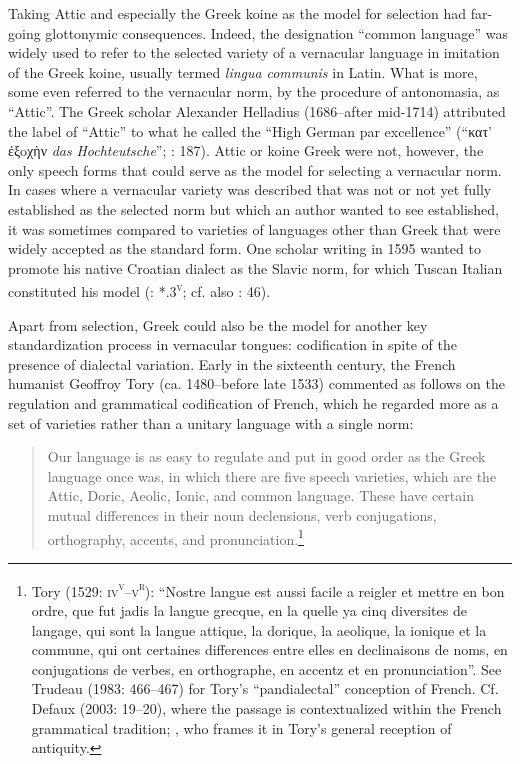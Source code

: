 Taking Attic and especially the Greek koine as the model for selection had far-going glottonymic consequences. Indeed, the designation “common language” was widely used to refer to the selected variety of a vernacular language in imitation of the Greek koine, usually termed \textit{lingua} \textit{communis} in Latin. What is more, some even referred to the vernacular norm, by the procedure of antonomasia, as “Attic”. The Greek scholar Alexander Helladius (1686–after mid-1714) attributed the label of “Attic” to what he called the “High German par excellence” (“κατ’ ἐξoχὴν \textit{das} \textit{Hochteutsche}”; \citealt{Helladius1714}: 187). Attic or koine Greek were not, however, the only speech forms that could serve as the model for selecting a vernacular norm. In cases where a vernacular variety was described that was not or not yet fully established as the selected norm but which an author wanted to see established, it was sometimes compared to varieties of languages other than Greek that were widely accepted as the standard form. One scholar writing in 1595 wanted to promote his native Croatian dialect as the Slavic norm, for which Tuscan Italian constituted his model (\citealt{Veranzio1595}: *.3\textsc{\textsuperscript{v}}; cf. also \citealt{Schoppe1636}: 46).

Apart from selection, Greek could also be the model for another key standardization process in vernacular tongues: codification in spite of the presence of dialectal variation. Early in the sixteenth century, the French humanist Geoffroy Tory (ca. 1480–before late 1533) commented as follows on the regulation and grammatical codification of French, which he regarded more as a set of varieties rather than a unitary language with a single norm:

\begin{quote}
Our language is as easy to regulate and put in good order as the Greek language once was, in which there are five speech varieties, which are the Attic, Doric, Aeolic, Ionic, and common language. These have certain mutual differences in their noun declensions, verb conjugations, orthography, accents, and pronunciation.\footnote{Tory (1529: \textsc{iv}\textsc{\textsuperscript{v}}\textsc{–v}\textsc{\textsuperscript{r}}): “Nostre langue est aussi facile a reigler et mettre en bon ordre, que fut jadis la langue grecque, en la quelle ya cinq diversites de langage, qui sont la langue attique, la dorique, la aeolique, la ionique et la commune, qui ont certaines differences entre elles en declinaisons de noms, en conjugations de verbes, en orthographe, en accentz et en pronunciation”. See Trudeau (1983: 466–467) for Tory’s “pandialectal” conception of French. Cf. Defaux (2003: 19–20), where the passage is contextualized within the French grammatical tradition; \citet[23]{Cordier2006}, who frames it in Tory’s general reception of antiquity.}
\end{quote}

